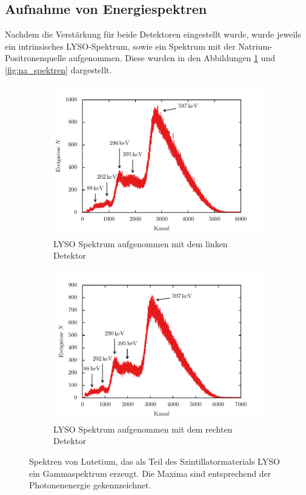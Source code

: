 \documentclass[11pt, a4paper]{article}
\numberwithin{equation}{section}
\begin{document}
\subsection{Aufnahme von Energiespektren}
Nachdem die Verstärkung für beide Detektoren eingestellt wurde, wurde jeweils ein intrinsisches LYSO-Spektrum, sowie ein Spektrum mit der Natrium-Positronenquelle aufgenommen.
Diese wurden in den Abbildungen \ref{fig:lyso_spektren} und \ref{fig:na_spektren} dargestellt.
\begin{figure}[htbp]
	\centering
	\begin{subfigure}{\textwidth}
		\centering
		\includegraphics[width=\textwidth]{./figures/LYSO_links}
		\caption{LYSO Spektrum aufgenommen mit dem linken Detektor}
	\end{subfigure}
	\begin{subfigure}{\textwidth}
		\centering
		\includegraphics[width=\textwidth]{./figures/LYSO_rechts}
		\caption{LYSO Spektrum aufgenommen mit dem rechten Detektor}
	\end{subfigure}
	\caption{Spektren von Lutetium, das als Teil des Szintillatormaterials LYSO ein Gammaspektrum erzeugt. Die Maxima sind entsprechend der Photonenenergie gekennzeichnet.}
	\label{fig:lyso_spektren}
\end{figure}
\end{document}
